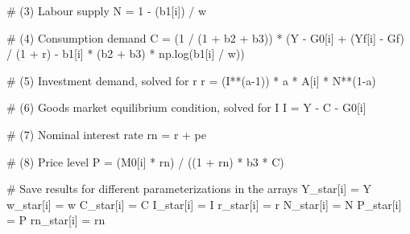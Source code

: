 \documentclass[
  letterpaper,
  DIV=11,
  numbers=noendperiod]{scrreprt}
\newenvironment{Shaded}{\begin{snugshade}}{\end{snugshade}}
\newcommand{\CommentTok}[1]{\textcolor[rgb]{0.37,0.37,0.37}{#1}}
\newcommand{\DecValTok}[1]{\textcolor[rgb]{0.68,0.00,0.00}{#1}}
\newcommand{\NormalTok}[1]{\textcolor[rgb]{0.00,0.23,0.31}{#1}}
\newcommand{\OperatorTok}[1]{\textcolor[rgb]{0.37,0.37,0.37}{#1}}
\begin{document}
\begin{tcolorbox}
\begin{Shaded}
\begin{Highlighting}[]
        \CommentTok{\# (3) Labour supply}
\NormalTok{        N }\OperatorTok{=} \DecValTok{1} \OperatorTok{{-}}\NormalTok{ (b1[i]) }\OperatorTok{/}\NormalTok{ w}

        \CommentTok{\# (4) Consumption demand}
\NormalTok{        C }\OperatorTok{=}\NormalTok{ (}\DecValTok{1} \OperatorTok{/}\NormalTok{ (}\DecValTok{1} \OperatorTok{+}\NormalTok{ b2 }\OperatorTok{+}\NormalTok{ b3)) }\OperatorTok{*}\NormalTok{ (Y }\OperatorTok{{-}}\NormalTok{ G0[i] }\OperatorTok{+}\NormalTok{ (Yf[i] }\OperatorTok{{-}}\NormalTok{ Gf) }\OperatorTok{/}\NormalTok{ (}\DecValTok{1} \OperatorTok{+}\NormalTok{ r) }\OperatorTok{{-}}\NormalTok{ b1[i] }\OperatorTok{*}\NormalTok{ (b2 }\OperatorTok{+}\NormalTok{ b3) }\OperatorTok{*}\NormalTok{ np.log(b1[i] }\OperatorTok{/}\NormalTok{ w))}

        \CommentTok{\# (5) Investment demand, solved for r}
\NormalTok{        r }\OperatorTok{=}\NormalTok{ (I}\OperatorTok{**}\NormalTok{(a}\OperatorTok{{-}}\DecValTok{1}\NormalTok{)) }\OperatorTok{*}\NormalTok{ a }\OperatorTok{*}\NormalTok{ A[i] }\OperatorTok{*}\NormalTok{ N}\OperatorTok{**}\NormalTok{(}\DecValTok{1}\OperatorTok{{-}}\NormalTok{a)}

        \CommentTok{\# (6) Goods market equilibrium condition, solved for I}
\NormalTok{        I }\OperatorTok{=}\NormalTok{ Y }\OperatorTok{{-}}\NormalTok{ C }\OperatorTok{{-}}\NormalTok{ G0[i]}

        \CommentTok{\# (7) Nominal interest rate}
\NormalTok{        rn }\OperatorTok{=}\NormalTok{ r }\OperatorTok{+}\NormalTok{ pe}

        \CommentTok{\# (8) Price level}
\NormalTok{        P }\OperatorTok{=}\NormalTok{ (M0[i] }\OperatorTok{*}\NormalTok{ rn) }\OperatorTok{/}\NormalTok{ ((}\DecValTok{1} \OperatorTok{+}\NormalTok{ rn) }\OperatorTok{*}\NormalTok{ b3 }\OperatorTok{*}\NormalTok{ C)}

    \CommentTok{\# Save results for different parameterizations in the arrays}
\NormalTok{    Y\_star[i] }\OperatorTok{=}\NormalTok{ Y}
\NormalTok{    w\_star[i] }\OperatorTok{=}\NormalTok{ w}
\NormalTok{    C\_star[i] }\OperatorTok{=}\NormalTok{ C}
\NormalTok{    I\_star[i] }\OperatorTok{=}\NormalTok{ I}
\NormalTok{    r\_star[i] }\OperatorTok{=}\NormalTok{ r}
\NormalTok{    N\_star[i] }\OperatorTok{=}\NormalTok{ N}
\NormalTok{    P\_star[i] }\OperatorTok{=}\NormalTok{ P}
\NormalTok{    rn\_star[i] }\OperatorTok{=}\NormalTok{ rn}
\end{Highlighting}
\end{Shaded}

\end{tcolorbox}
\end{document}
